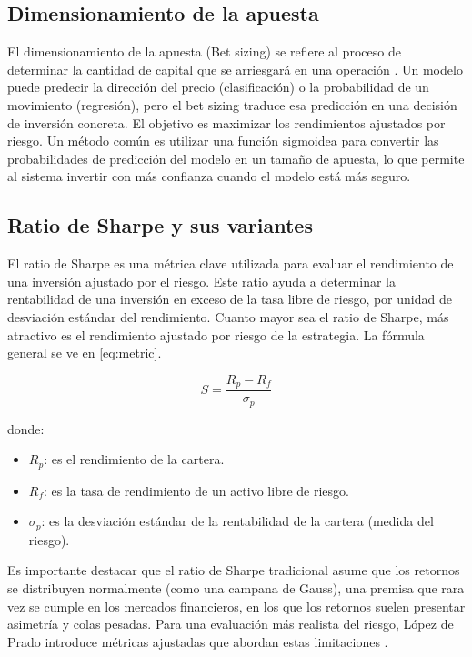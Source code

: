 \subsection{Dimensionamiento de la apuesta }
El dimensionamiento de la apuesta (Bet sizing) se refiere al proceso de determinar la cantidad de capital que se arriesgará en una operación \cite{LoP:2018}. Un modelo puede predecir la dirección del precio (clasificación) o la probabilidad de un movimiento (regresión), pero el bet sizing traduce esa predicción en una decisión de inversión concreta. El objetivo es maximizar los rendimientos ajustados por riesgo. Un método común es utilizar una función sigmoidea para convertir las probabilidades de predicción del modelo en un tamaño de apuesta, lo que permite al sistema invertir con más confianza cuando el modelo está más seguro.

\subsection{Ratio de Sharpe y sus variantes}
El ratio de Sharpe \cite{Sharpe:1966} es una métrica clave utilizada para evaluar el rendimiento de una inversión ajustado por el riesgo. Este ratio ayuda a determinar la rentabilidad de una inversión en exceso de la tasa libre de riesgo, por unidad de desviación estándar del rendimiento. Cuanto mayor sea el ratio de Sharpe, más atractivo es el rendimiento ajustado por riesgo de la estrategia. La fórmula general se ve en \ref{eq:metric}.

\begin{equation}
	\label{eq:metric}
	S = \frac{R_p - R_f}{\sigma_p}
\end{equation}


donde:
\begin{itemize}
    \item $R_p$: es el rendimiento de la cartera.
    \item $R_f$: es la tasa de rendimiento de un activo libre de riesgo.
    \item $\sigma_p$: es la desviación estándar de la rentabilidad de la cartera (medida del riesgo).
\end{itemize}

Es importante destacar que el ratio de Sharpe tradicional asume que los retornos se distribuyen normalmente (como una campana de Gauss), una premisa que rara vez se cumple en los mercados financieros, en los que los retornos suelen presentar asimetría y colas pesadas. Para una evaluación más realista del riesgo, López de Prado introduce métricas ajustadas que abordan estas limitaciones \cite{LoP:2018}.

